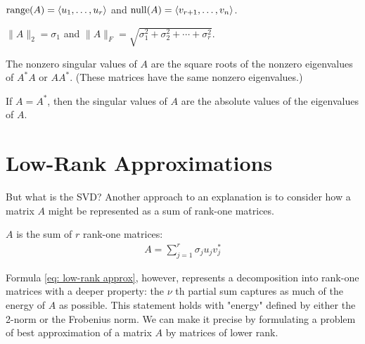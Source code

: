 \begin{theorem}
\label{thm: range and null of svd}
$ \operatorname{range}(A) = \langle u_1,\ldots ,u_r  \rangle  $ and $\operatorname{null}(A) = \langle v_{r+1},\ldots ,v_n \rangle $. 
\end{theorem}


\begin{theorem}
\label{thm: 2norm and fnorm }
$\|A\|_2 = \sigma _1$ and $\|A\|_F = \sqrt{\sigma _1^2 + \sigma _2^2 + \cdots + \sigma _r^2} $. 
\end{theorem}


\begin{theorem}
\label{thm: Eig and svd}
The nonzero singular values of $A$ are the square roots of the nonzero eigenvalues of $A^* A$ or $A A^*$. (These matrices have the same nonzero eigenvalues.)
\end{theorem}



\begin{theorem}
\label{thm: hermitian svd }
If $A=A^*$, then the singular values of $A$ are the absolute values of the eigenvalues of $A$.
\end{theorem}

\section{Low-Rank Approximations}
But what is the SVD? Another approach to an explanation is to consider how a matrix $A$ might be represented as a sum of rank-one matrices.


\begin{theorem}
\label{thm: low-rank approx}
$A$ is the sum of $r$ rank-one matrices:
\begin{align}
    \label{eq: low-rank approx}
A=\sum_{j=1}^r \sigma_j u_j v_j^*
\end{align}
\end{theorem}

Formula \eqref{eq: low-rank approx}, however, represents a decomposition into rank-one matrices with a deeper property: the $\nu$ th partial sum captures as much of the energy of $A$ as possible. This statement holds with "energy" defined by either the 2-norm or the Frobenius norm. We can make it precise by formulating a problem of best approximation of a matrix $A$ by matrices of lower rank.


